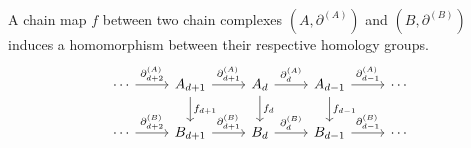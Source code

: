 \begin{theorem}
	\label{chainmaps} A chain map $f$ between two chain complexes $(A, \partial^{(A)}
	)$ and $(B, \partial^{(B)})$ induces a homomorphism between their respective homology
	groups.
	\begin{equation}
		\begin{tikzcd}
			\cdots \arrow[r, "\partial^{(A)}_{d+2}"] & A_{d+1} \arrow[r, "\partial^{(A)}_{d+1}"]
			\arrow[d, "f_{d+1}"] & A_d \arrow[r, "\partial^{(A)}_{d}"] \arrow[d, "f_d"]
			& A_{d-1} \arrow[r, "\partial^{(A)}_{d-1}"] \arrow[d, "f_{d-1}"] & \cdots \\
			\cdots \arrow[r, "\partial^{(B)}_{d+2}"] & B_{d+1} \arrow[r, "\partial^{(B)}_{d+1}"]
			& B_d \arrow[r, "\partial^{(B)}_d"] & B_{d-1} \arrow[r, "\partial^{(B)}_{d-1}"]
			& \cdots
		\end{tikzcd}
	\end{equation}
\end{theorem}

